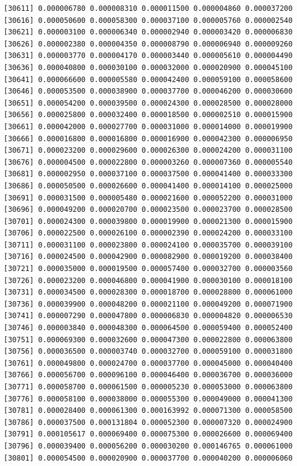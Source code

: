\documentclass[]{article}
\begin{document}
\begin{verbatim}
[30611] 0.000006780 0.000008310 0.000011500 0.000004860 0.000037200
[30616] 0.000050600 0.000058300 0.000037100 0.000005760 0.000002540
[30621] 0.000003100 0.000006340 0.000002940 0.000003420 0.000006830
[30626] 0.000002380 0.000004350 0.000008790 0.000006940 0.000009260
[30631] 0.000003770 0.000004170 0.000003440 0.000005610 0.000004490
[30636] 0.000040800 0.000030100 0.000032000 0.000020900 0.000045100
[30641] 0.000066600 0.000005580 0.000042400 0.000059100 0.000058600
[30646] 0.000053500 0.000038900 0.000037700 0.000046200 0.000030600
[30651] 0.000054200 0.000039500 0.000024300 0.000028500 0.000028000
[30656] 0.000025800 0.000032400 0.000018500 0.000002510 0.000015900
[30661] 0.000042000 0.000027700 0.000031000 0.000014000 0.000019900
[30666] 0.000016800 0.000016800 0.000016900 0.000042300 0.000006950
[30671] 0.000023200 0.000029600 0.000026300 0.000024200 0.000031100
[30676] 0.000004500 0.000022800 0.000003260 0.000007360 0.000005540
[30681] 0.000002950 0.000037100 0.000037500 0.000041400 0.000033300
[30686] 0.000050500 0.000026600 0.000041400 0.000014100 0.000025000
[30691] 0.000031500 0.000005480 0.000021600 0.000052200 0.000031000
[30696] 0.000049200 0.000020700 0.000023500 0.000023700 0.000028500
[30701] 0.000024300 0.000039800 0.000019900 0.000021300 0.000015900
[30706] 0.000022500 0.000026100 0.000002390 0.000024200 0.000033100
[30711] 0.000031100 0.000023800 0.000024100 0.000035700 0.000039100
[30716] 0.000024500 0.000042900 0.000082900 0.000019200 0.000038400
[30721] 0.000035000 0.000019500 0.000057400 0.000032700 0.000003560
[30726] 0.000023200 0.000046800 0.000041900 0.000030100 0.000018100
[30731] 0.000034500 0.000028300 0.000018700 0.000028800 0.000061000
[30736] 0.000039900 0.000048200 0.000021100 0.000049200 0.000071900
[30741] 0.000007290 0.000047800 0.000006830 0.000004820 0.000006530
[30746] 0.000003840 0.000048300 0.000064500 0.000059400 0.000052400
[30751] 0.000069300 0.000032600 0.000047300 0.000022800 0.000063800
[30756] 0.000036500 0.000003740 0.000032700 0.000059100 0.000031800
[30761] 0.000049800 0.000024700 0.000037700 0.000045000 0.000040400
[30766] 0.000056700 0.000096100 0.000046400 0.000036700 0.000036000
[30771] 0.000058700 0.000061500 0.000005230 0.000053000 0.000063800
[30776] 0.000058100 0.000038000 0.000055300 0.000049000 0.000041300
[30781] 0.000028400 0.000061300 0.000163992 0.000071300 0.000058500
[30786] 0.000037500 0.000131804 0.000052300 0.000007320 0.000024900
[30791] 0.000105617 0.000069400 0.000075300 0.000026600 0.000069400
[30796] 0.000039400 0.000056200 0.000030200 0.000146765 0.000061000
[30801] 0.000054500 0.000020900 0.000037700 0.000040200 0.000006060

\end{verbatim}
\end{document}
